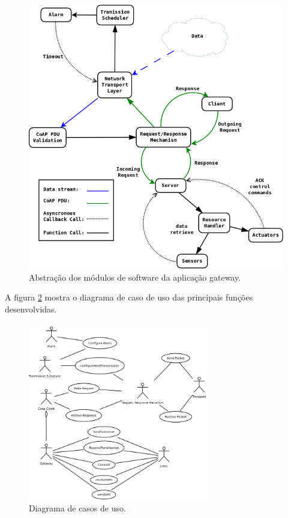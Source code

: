\begin{figure}[H]
   \label{diagramaSequenciaCoapClient}
   \centering
   \includegraphics[width=1.0\textwidth]{figuras/coap.png}
   \caption{Abstra\c{c}\~ao dos m\'odulos de software da aplica\c{c}\~ao gateway.}
\end{figure}

A figura \ref{casodeuso} mostra o diagrama de caso de uso das principais fun\c{c}\~oes desenvolvidas.
\begin{figure}[H]
   \label{casodeuso}
   \centering
   \includegraphics[width=0.7\textwidth]{figuras/casodeuso.png}
   \caption{Diagrama de casos de uso.}
\end{figure}

